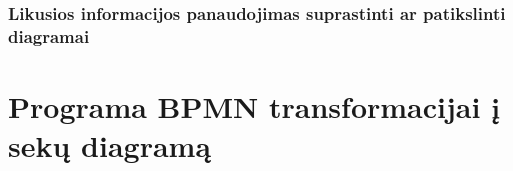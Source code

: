 \documentclass{VUMIFInfBakalaurinis}
\begin{document}
\subsubsection{Likusios informacijos panaudojimas suprastinti ar patikslinti diagramai}


\section{Programa \textbf{BPMN} transformacijai į \textbf{sekų diagramą}}   





\printbibliography[heading=bibintoc] %


\appendix  %




\end{document}
